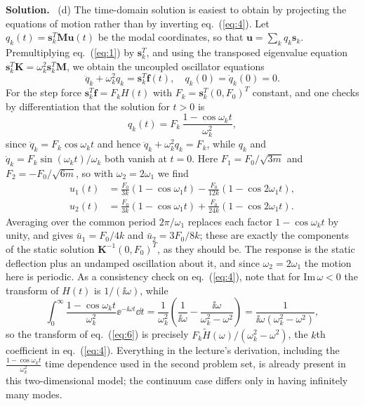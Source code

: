 \documentclass[a4paper,12pt]{paper}
\newenvironment{solution}{\par\noindent\textbf{Solution.}\ }{\par\medskip}
\begin{document}
\begin{solution}
(d) The time-domain solution is easiest to obtain by projecting the equations of motion rather
than by inverting eq.~(\ref{eq:4}). Let $q_{k}(t)=\mathbf{s}_{k}^{T}\mathbf{M}\mathbf{u}(t)$ be the
modal coordinates, so that $\mathbf{u}=\sum_{k}q_{k}\mathbf{s}_{k}$. Premultiplying
eq.~(\ref{eq:1}) by $\mathbf{s}_{k}^{T}$, and using the transposed eigenvalue equation
$\mathbf{s}_{k}^{T}\mathbf{K}=\omega_{k}^{2}\mathbf{s}_{k}^{T}\mathbf{M}$, we obtain the
uncoupled oscillator equations
\begin{equation}
\ddot{q}_{k}+\omega_{k}^{2}q_{k}=\mathbf{s}_{k}^{T}\mathbf{f}(t),\quad q_{k}(0)=\dot{q}_{k}(0)=0.
\label{eq:5}
\end{equation}
For the step force $\mathbf{s}_{k}^{T}\mathbf{f}=F_{k}H(t)$ with $F_{k}=\mathbf{s}_{k}^{T}(0,F_{0})^{T}$
constant, and one checks by differentiation that the solution for $t>0$ is
\begin{equation}
q_{k}(t)=F_{k}\,\frac{1-\cos\omega_{k}t}{\omega_{k}^{2}},
\label{eq:6}
\end{equation}
since $\ddot{q}_{k}=F_{k}\cos\omega_{k}t$ and hence $\ddot{q}_{k}+\omega_{k}^{2}q_{k}=F_{k}$,
while $q_{k}$ and $\dot{q}_{k}=F_{k}\sin(\omega_{k}t)/\omega_{k}$ both vanish at $t=0$. Here
$F_{1}=F_{0}/\sqrt{3m}$ and $F_{2}=-F_{0}/\sqrt{6m}$, so with $\omega_{2}=2\omega_{1}$ we find
\begin{align}
u_{1}(t)&=\frac{F_{0}}{3k}(1-\cos\omega_{1}t)-\frac{F_{0}}{12k}(1-\cos 2\omega_{1}t),\nonumber\\
u_{2}(t)&=\frac{F_{0}}{3k}(1-\cos\omega_{1}t)+\frac{F_{0}}{24k}(1-\cos 2\omega_{1}t).
\label{eq:7}
\end{align}
Averaging over the common period $2\pi/\omega_{1}$ replaces each factor $1-\cos\omega_{k}t$
by unity, and gives $\bar{u}_{1}=F_{0}/4k$ and $\bar{u}_{2}=3F_{0}/8k$; these are exactly the
components of the static solution $\mathbf{K}^{-1}(0,F_{0})^{T}$, as they should be. The response is the static
deflection plus an undamped oscillation about it, and since $\omega_{2}=2\omega_{1}$ the motion
here is periodic.
As a consistency check on eq.~(\ref{eq:4}), note that for $\mathrm{Im}\,\omega<0$ the transform of
$H(t)$ is $1/(\ii\omega)$, while
\begin{equation}
\int_{0}^{\infty}\frac{1-\cos\omega_{k}t}{\omega_{k}^{2}}\ee^{-\ii\omega t}\dd t
=\frac{1}{\omega_{k}^{2}}\left(\frac{1}{\ii\omega}-\frac{\ii\omega}{\omega_{k}^{2}-\omega^{2}}\right)
=\frac{1}{\ii\omega(\omega_{k}^{2}-\omega^{2})},
\label{eq:8}
\end{equation}
so the transform of eq.~(\ref{eq:6}) is precisely $F_{k}\tilde{H}(\omega)/(\omega_{k}^{2}-\omega^{2})$,
the $k$th coefficient in eq.~(\ref{eq:4}). Everything in the lecture's derivation, including the
$\frac{1-\cos\omega_{k}t}{\omega_{k}^{2}}$ time dependence used in the second problem set, is already
present in this two-dimensional model; the continuum case differs only in having infinitely many modes.
\end{solution}
\end{document}
